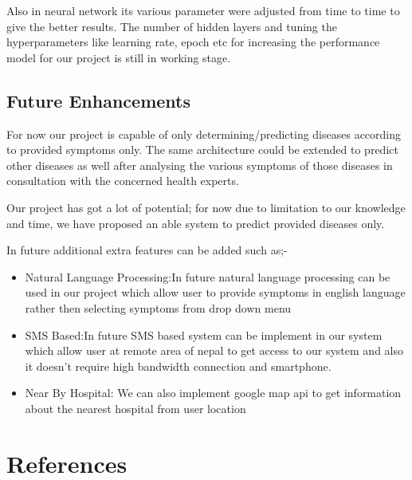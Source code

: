 {Also in neural network its various parameter were adjusted from time to time to give 
the better results. The number of hidden layers and tuning the hyperparameters like
learning rate, epoch etc for increasing the performance model for our project is still in 
working stage.

\section{Future Enhancements}

For now our project is capable of only determining/predicting diseases according to provided
symptoms only. The same architecture could be extended to predict other diseases as well
after analysing the various symptoms of those diseases in consultation with the concerned 
health experts. 

Our project has got a lot of potential; for now due to limitation to our knowledge and time, we have proposed an able system to predict provided diseases only.

In future additional extra features can be added such as;- 
\begin{itemize}
    \item Natural Language Processing:In future natural language processing can be used in our project which allow user to provide symptoms in english language rather then selecting symptoms from drop down menu
    \item SMS Based:In future SMS based system can be implement in our system which allow user at remote area of nepal to get access to our system and also it doesn't require high bandwidth connection and smartphone.
   
   \item Near By Hospital: We can also implement google map api to get information about the nearest hospital from user location
        
\end{itemize}



\chapter*{References}

}
